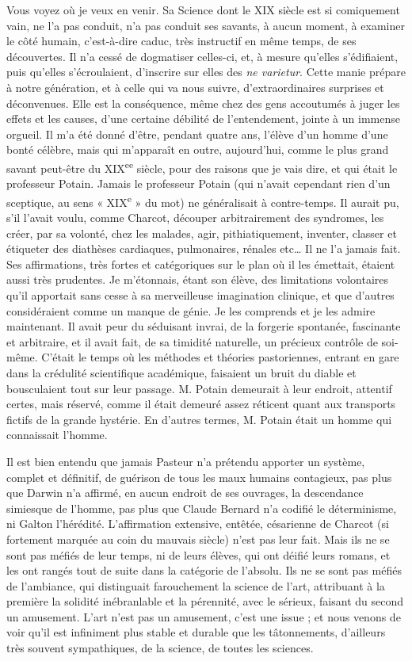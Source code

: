 \documentclass[french,twoside]{book} %
\begin{document}
Vous voyez où je veux en venir. Sa Science dont le XIX siècle est si comiquement vain, ne l’a pas conduit, n’a pas conduit ses savants, à aucun moment, à examiner le côté humain, c’est-à-dire caduc, très instructif en même temps, de ses découvertes. Il n’a cessé de dogmatiser celles-ci, et, à mesure qu’elles s’édifiaient, puis qu’elles s’écroulaient, d’inscrire sur elles des {\itshape ne varietur}. Cette manie prépare à notre génération, et à celle qui va nous suivre, d’extraordinaires surprises et déconvenues. Elle est la conséquence, même chez des gens accoutumés à juger les effets et les causes, d’une certaine débilité de l’entendement, jointe à un immense orgueil. Il m’a été donné d’être, pendant quatre ans, l’élève d’un homme d’une bonté célèbre, mais qui m’apparaît en outre, aujourd’hui, comme le plus grand savant peut-être du XIX\textsuperscript{ee} siècle, pour des raisons que je vais dire, et qui était le professeur Potain. Jamais le professeur Potain (qui n’avait cependant rien d’un sceptique, au sens « XIX\textsuperscript{e} » du mot) ne généralisait à contre-temps. Il aurait pu, s’il l’avait voulu, comme Charcot, découper arbitrairement des syndromes, les créer, par sa volonté, chez les malades, agir, pithiatiquement, inventer, classer et étiqueter des diathèses cardiaques, pulmonaires, rénales etc… Il ne l’a jamais fait. Ses affirmations, très fortes et catégoriques sur le plan où il les émettait, étaient aussi très prudentes. Je m’étonnais, étant son élève, des limitations volontaires qu’il apportait sans cesse à sa merveilleuse imagination clinique, et que d’autres considéraient comme un manque de génie. Je les comprends et je les admire maintenant. Il avait peur du séduisant invrai, de la forgerie spontanée, fascinante et arbitraire, et il avait fait, de sa timidité naturelle, un précieux contrôle de soi-même. C’était le temps où les méthodes et théories pastoriennes, entrant en gare dans la crédulité scientifique académique, faisaient un bruit du diable et bousculaient tout sur leur passage. M. Potain demeurait à leur endroit, attentif certes, mais réservé, comme il était demeuré assez réticent quant aux transports fictifs de la grande hystérie. En d’autres termes, M. Potain était un homme qui connaissait l’homme.\par
Il est bien entendu que jamais Pasteur n’a prétendu apporter un système, complet et définitif, de guérison de tous les maux humains contagieux, pas plus que Darwin n’a affirmé, en aucun endroit de ses ouvrages, la descendance simiesque de l’homme, pas plus que Claude Bernard n’a codifié le déterminisme, ni Galton l’hérédité. L’affirmation extensive, entêtée, césarienne de Charcot (si fortement marquée au coin du mauvais siècle) n’est pas leur fait. Mais ils ne se sont pas méfiés de leur temps, ni de leurs élèves, qui ont déifié leurs romans, et les ont rangés tout de suite dans la catégorie de l’absolu. Ils ne se sont pas méfiés de l’ambiance, qui distinguait farouchement la science de l’art, attribuant à la première la solidité inébranlable et la pérennité, avec le sérieux, faisant du second un amusement. L’art n’est pas un amusement, c’est une issue ; et nous venons de voir qu’il est infiniment plus stable et durable que les tâtonnements, d’ailleurs très souvent sympathiques, de la science, de toutes les sciences.\par
\end{document}
